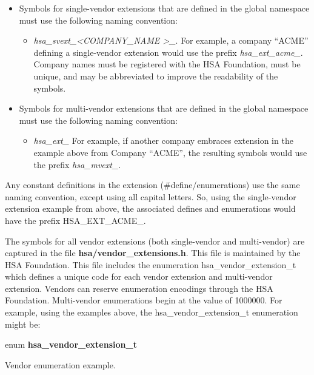 \documentclass{book}
\newcommand{\hsadef}[2]{\hypertarget{#1}{\textbf{#2}}}
\newcommand{\reftyp}[1]{#1}
\newcommand{\refenu}[1]{\reftyp{#1}}
\begin{document}
\begin{itemize}
\item Symbols for single-vendor extensions that are defined in the
global namespace must use the following naming convention:
  \begin{itemize}
    \item \emph{hsa\_svext\_\textless COMPANY\_NAME \textgreater\_}.
    For example, a company ``ACME'' defining a single-vendor extension
    would use the prefix \emph{hsa\_ext\_acme\_}. Company names must
    be registered with the HSA Foundation, must be unique, and may be
    abbreviated to improve the readability of the symbols.
  \end{itemize}
\item Symbols for multi-vendor extensions that are defined in the
global namespace must use the following naming convention:
  \begin{itemize}
    \item \emph{hsa\_ext\_} For example, if another company
    embraces extension in the example above from Company ``ACME'', the
    resulting symbols would use the prefix \emph{hsa\_mvext\_}.
  \end{itemize}
\end{itemize}

Any constant definitions in the extension (\#define/enumerations) use
the same naming convention, except using all capital letters. So,
using the single-vendor extension example from above, the associated
defines and enumerations would have the prefix
\refenu{HSA\_EXT\_ACME\_}.

The symbols for all vendor extensions (both single-vendor and
multi-vendor) are captured in the file {\bf hsa/vendor\_extensions.h}.
This file is maintained by the HSA Foundation.  This file includes
the enumeration \reftyp{hsa\_vendor\_extension\_t} which defines a
unique code for each vendor extension and multi-vendor extension.
Vendors can reserve enumeration encodings through the HSA
Foundation. Multi-vendor enumerations begin at the value of
1000000. For example, using the examples above, the
\reftyp{hsa\_vendor\_extension\_t} enumeration might be:

\makeatletter{}

\noindent\begin{tcolorbox}[nobeforeafter,arc=0mm,colframe=white,colback=lightgray,left=0mm]
enum \hsadef{group__ENU__vendor__ext_1gaa8dfc9ba0911c03af38071bd3ae0df00}{hsa\_vendor\_extension\_t}
\end{tcolorbox}
Vendor enumeration example.
\end{document}
